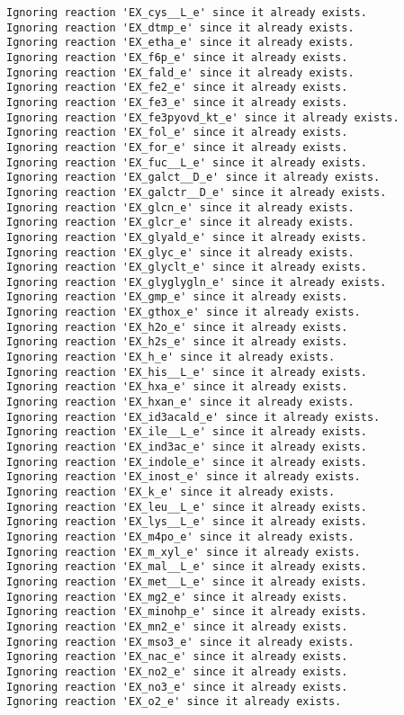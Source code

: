 \documentclass[
  letterpaper,
  DIV=11,
  numbers=noendperiod]{scrartcl}
\begin{document}
\begin{verbatim}
Ignoring reaction 'EX_cys__L_e' since it already exists.
Ignoring reaction 'EX_dtmp_e' since it already exists.
Ignoring reaction 'EX_etha_e' since it already exists.
Ignoring reaction 'EX_f6p_e' since it already exists.
Ignoring reaction 'EX_fald_e' since it already exists.
Ignoring reaction 'EX_fe2_e' since it already exists.
Ignoring reaction 'EX_fe3_e' since it already exists.
Ignoring reaction 'EX_fe3pyovd_kt_e' since it already exists.
Ignoring reaction 'EX_fol_e' since it already exists.
Ignoring reaction 'EX_for_e' since it already exists.
Ignoring reaction 'EX_fuc__L_e' since it already exists.
Ignoring reaction 'EX_galct__D_e' since it already exists.
Ignoring reaction 'EX_galctr__D_e' since it already exists.
Ignoring reaction 'EX_glcn_e' since it already exists.
Ignoring reaction 'EX_glcr_e' since it already exists.
Ignoring reaction 'EX_glyald_e' since it already exists.
Ignoring reaction 'EX_glyc_e' since it already exists.
Ignoring reaction 'EX_glyclt_e' since it already exists.
Ignoring reaction 'EX_glyglygln_e' since it already exists.
Ignoring reaction 'EX_gmp_e' since it already exists.
Ignoring reaction 'EX_gthox_e' since it already exists.
Ignoring reaction 'EX_h2o_e' since it already exists.
Ignoring reaction 'EX_h2s_e' since it already exists.
Ignoring reaction 'EX_h_e' since it already exists.
Ignoring reaction 'EX_his__L_e' since it already exists.
Ignoring reaction 'EX_hxa_e' since it already exists.
Ignoring reaction 'EX_hxan_e' since it already exists.
Ignoring reaction 'EX_id3acald_e' since it already exists.
Ignoring reaction 'EX_ile__L_e' since it already exists.
Ignoring reaction 'EX_ind3ac_e' since it already exists.
Ignoring reaction 'EX_indole_e' since it already exists.
Ignoring reaction 'EX_inost_e' since it already exists.
Ignoring reaction 'EX_k_e' since it already exists.
Ignoring reaction 'EX_leu__L_e' since it already exists.
Ignoring reaction 'EX_lys__L_e' since it already exists.
Ignoring reaction 'EX_m4po_e' since it already exists.
Ignoring reaction 'EX_m_xyl_e' since it already exists.
Ignoring reaction 'EX_mal__L_e' since it already exists.
Ignoring reaction 'EX_met__L_e' since it already exists.
Ignoring reaction 'EX_mg2_e' since it already exists.
Ignoring reaction 'EX_minohp_e' since it already exists.
Ignoring reaction 'EX_mn2_e' since it already exists.
Ignoring reaction 'EX_mso3_e' since it already exists.
Ignoring reaction 'EX_nac_e' since it already exists.
Ignoring reaction 'EX_no2_e' since it already exists.
Ignoring reaction 'EX_no3_e' since it already exists.
Ignoring reaction 'EX_o2_e' since it already exists.

\end{verbatim}
\end{document}
